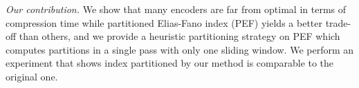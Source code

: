 \documentclass[runningheads,a4paper]{llncs}
\begin{document}
\textit{Our contribution.}
We show that many encoders are far from optimal in terms of compression time while partitioned Elias-Fano index (PEF) yields a better trade-off than others, and we provide a heuristic partitioning strategy on PEF which computes partitions in a single pass with only one sliding window. We perform an experiment that shows index partitioned by our method is comparable to the original one.

%
\end{document}
